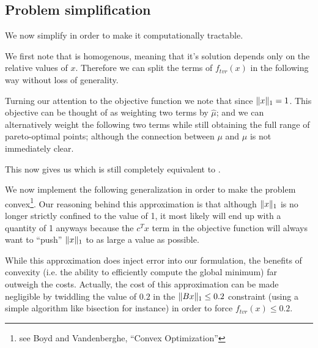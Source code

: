 \documentclass{article}
\begin{document}
\subsection{Problem simplification}
    We now simplify  in order 
        to make it computationally tractable.

    We first note that  is homogenous,
        meaning that it's solution depends only on the relative values of $x$.
    Therefore we can split the terms of $f_{tvr}(x)$ in the following way
        without loss of generality.

    Turning our attention to the objective function we note that
        since $\|x\|_1 = 1$.
    This objective can be thought of as 
        weighting two terms by $\hat{\mu}$;
        and we can alternatively weight the following two terms
        while still obtaining the full range of pareto-optimal points;
        although the connection between $\mu$ and $\hat{\mu}$
        is not immediately clear.

    This now gives us
        which is still completely equivalent to .

    We now implement the following generalization
        in order to make the problem 
        convex\footnote{see Boyd and Vandenberghe, ``Convex Optimization''}.
    Our reasoning behind this approximation
        is that although $\|x\|_1$ is no longer 
        strictly confined to the value of 1,
        it most likely will end up with a quantity of 1 anyways
        because the $c^T x$ term in the objective function will always want
        to ``push'' $\|x\|_1$ to as large a value as possible.

    While this approximation does inject error into our formulation,
        the benefits of convexity (i.e. the ability to efficiently compute
        the global minimum) far outweigh the costs.
    Actually, the cost of this approximation can be made negligible by
        twiddling the value of $0.2$ 
        in the $\|Bx\|_1 \le 0.2$ constraint 
        (using a simple algorithm like bisection for instance)
        in order to force $f_{tvr}(x) \le 0.2$.
    
\end{document}
